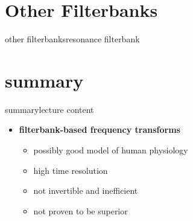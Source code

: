     \section[resonance]{Other Filterbanks}
        \begin{frame}{other filterbanks}{resonance filterbank}
        \end{frame}	

    \section{summary}
        \begin{frame}{summary}{lecture content}
            \begin{itemize}
                \item      \textbf{filterbank-based frequency transforms}
                    \begin{itemize}
                        \item   possibly good model of human physiology
                        \item   high time resolution
                        \item   not invertible and inefficient
                        \item   not proven to be superior
                    \end{itemize}
            \end{itemize}
        \end{frame}

